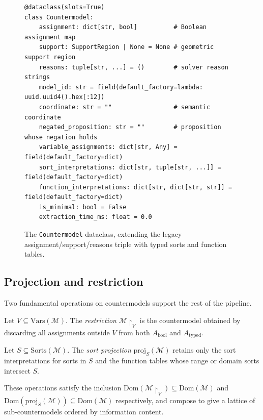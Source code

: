 \documentclass[11pt]{article}
\newcommand{\CMod}{\mathcal{M}}            %
\newcommand{\Vars}{\mathrm{Vars}}          %
\newcommand{\Dom}{\mathrm{Dom}}            %
\newcommand{\Proj}{\mathrm{proj}}          %
\begin{document}
\begin{figure}[ht]
\begin{lstlisting}[style=jugeo-python]
@dataclass(slots=True)
class Countermodel:
    assignment: dict[str, bool]          # Boolean assignment map
    support: SupportRegion | None = None # geometric support region
    reasons: tuple[str, ...] = ()        # solver reason strings
    model_id: str = field(default_factory=lambda: uuid.uuid4().hex[:12])
    coordinate: str = ""                 # semantic coordinate
    negated_proposition: str = ""        # proposition whose negation holds
    variable_assignments: dict[str, Any] = field(default_factory=dict)
    sort_interpretations: dict[str, tuple[str, ...]] = field(default_factory=dict)
    function_interpretations: dict[str, dict[str, str]] = field(default_factory=dict)
    is_minimal: bool = False
    extraction_time_ms: float = 0.0
\end{lstlisting}
\caption{The \texttt{Countermodel} dataclass, extending the legacy
         assignment/support/reasons triple with typed sorts and
         function tables.}
\label{fig:countermodel}
\end{figure}

\subsection{Projection and restriction}

Two fundamental operations on countermodels support the rest of the
pipeline.

\begin{definition}[Restriction]\label{def:restrict}
Let $V \subseteq \Vars(\CMod)$.  The \emph{restriction}
$\CMod \restriction_V$ is the countermodel obtained by discarding
all assignments outside $V$ from both $A_{\mathrm{bool}}$ and
$A_{\mathrm{typed}}$.
\end{definition}

\begin{definition}\label{def:proj}
Let $S \subseteq \mathrm{Sorts}(\CMod)$.  The \emph{sort projection}
$\Proj_S(\CMod)$ retains only the sort interpretations for sorts in $S$
and the function tables whose range or domain sorts intersect $S$.
\end{definition}

\noindent
These operations satisfy the inclusion
$\Dom(\CMod \restriction_V) \subseteq \Dom(\CMod)$ and
$\Dom(\Proj_S(\CMod)) \subseteq \Dom(\CMod)$ respectively, and compose
to give a lattice of sub-countermodels ordered by information content.
\end{document}
